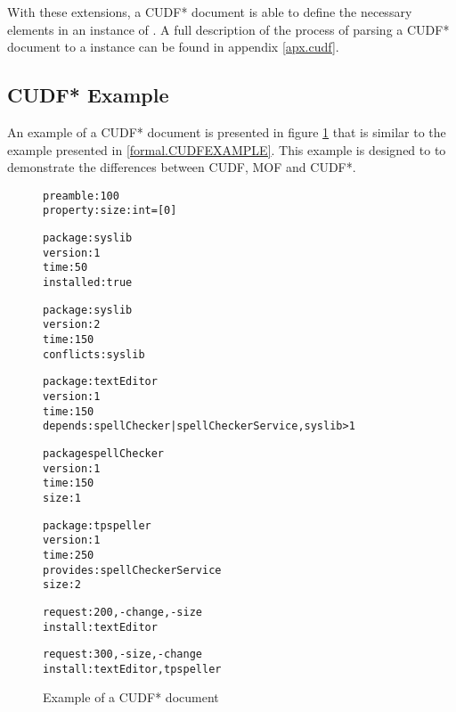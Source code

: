 With these extensions, a CUDF* document is able to define the necessary elements in an instance of \modelname.
A full description of the process of parsing a CUDF* document to a \modelname instance can be found in appendix \ref{apx.cudf}.

\subsection{CUDF* Example}
\label{formal.cudfstarexample}
An example of a CUDF* document is presented in figure \ref{formal.CUDFstarEXAMPLE} that is similar to the example presented in \ref{formal.CUDFEXAMPLE}.
This example is designed to to demonstrate the differences between CUDF, MOF and CUDF*.

\begin{figure}[htp] 
\begin{center}
\begin{alltt}
preamble: 100
property: size: int = [0]

package: syslib
version: 1
time: 50
installed: true

package: syslib
version: 2
time: 150
conflicts: syslib

package: textEditor
version: 1
time: 150
depends: spellChecker | spellCheckerService, syslib > 1

package spellChecker
version: 1
time: 150
size: 1

package: tpspeller
version: 1
time: 250
provides: spellCheckerService
size: 2

request: 200, -change,-size
install:textEditor

request: 300, -size,-change
install: textEditor, tpspeller

\end{alltt}
  \caption{Example of a CUDF* document}
  \label{formal.CUDFstarEXAMPLE}
\end{center}
\end{figure} 


